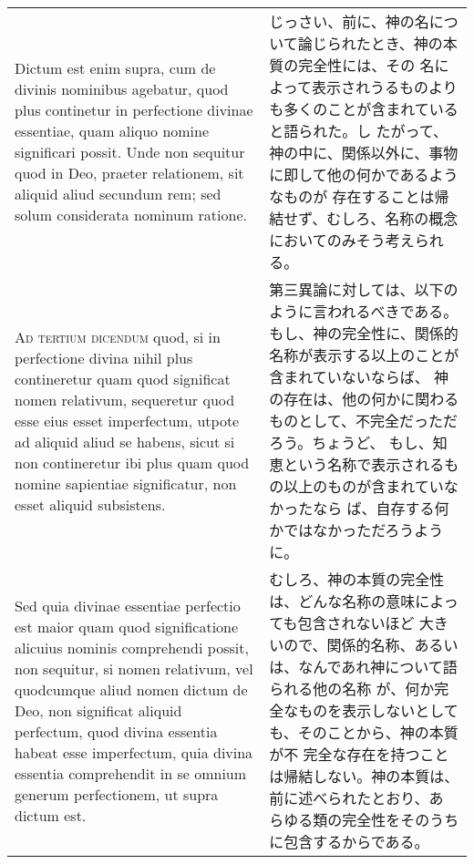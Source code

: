 \documentclass[10pt]{jsarticle} %
\begin{document}
\begin{longtable}{p{21em}p{21em}}
\\

Dictum est enim supra, cum de
divinis nominibus agebatur, quod plus continetur in perfectione divinae
essentiae, quam aliquo nomine significari possit. Unde non sequitur quod
in Deo, praeter relationem, sit aliquid aliud secundum rem; sed solum
considerata nominum ratione.


&

じっさい、前に、神の名について論じられたとき、神の本質の完全性には、その
 名によって表示されうるものよりも多くのことが含まれていると語られた。し
 たがって、神の中に、関係以外に、事物に即して他の何かであるようなものが
 存在することは帰結せず、むしろ、名称の概念においてのみそう考えられる。

\\



{\scshape Ad tertium dicendum} quod, si in perfectione divina nihil plus
contineretur quam quod significat nomen relativum, sequeretur quod esse
eius esset imperfectum, utpote ad aliquid aliud se habens, sicut si non
contineretur ibi plus quam quod nomine sapientiae significatur, non
esset aliquid subsistens. 


&

第三異論に対しては、以下のように言われるべきである。
もし、神の完全性に、関係的名称が表示する以上のことが含まれていないならば、
 神の存在は、他の何かに関わるものとして、不完全だっただろう。ちょうど、
 もし、知恵という名称で表示されるもの以上のものが含まれていなかったなら
 ば、自存する何かではなかっただろうように。


\\

Sed quia divinae essentiae perfectio est maior
quam quod significatione alicuius nominis comprehendi possit, non
sequitur, si nomen relativum, vel quodcumque aliud nomen dictum de Deo,
non significat aliquid perfectum, quod divina essentia habeat esse
imperfectum, quia divina essentia comprehendit in se omnium generum
perfectionem, ut supra dictum est.


&

むしろ、神の本質の完全性は、どんな名称の意味によっても包含されないほど
 大きいので、関係的名称、あるいは、なんであれ神について語られる他の名称
 が、何か完全なものを表示しないとしても、そのことから、神の本質が不
 完全な存在を持つことは帰結しない。神の本質は、前に述べられたとおり、あ
 らゆる類の完全性をそのうちに包含するからである。


\end{longtable}
\newpage
\end{document}

